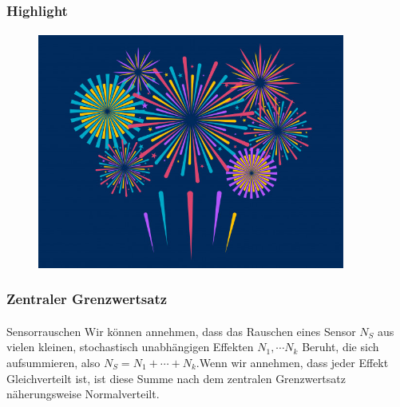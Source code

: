 \documentclass{beamer}
\begin{document}
\begin{frame}
    \frametitle{Highlight}
\framesubtitle{}
\begin{figure}[htp]
      \centering
    \includegraphics[width=0.9\textwidth]{img/firework}
\end{figure}
 \end{frame}


\begin{frame}
    \frametitle{Zentraler Grenzwertsatz}
\framesubtitle{}


\begin{block}{Sensorrauschen}
Wir können annehmen, dass das Rauschen eines Sensor $N_S$ aus vielen kleinen, stochastisch unabhängigen Effekten $N_1, \cdots N_k$ Beruht, die sich aufsummieren, also $N_S = N_1 + \cdots + N_k$.Wenn wir annehmen, dass jeder Effekt Gleichverteilt ist,  ist diese Summe nach dem zentralen Grenzwertsatz näherungsweise Normalverteilt.
\end{block}

 \end{frame}
\end{document}
